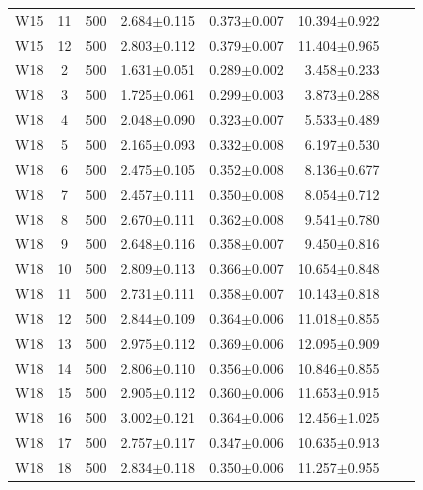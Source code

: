 \begin{table}[htbp]
\begin{tabular}{@{}ccrrrrrr@{}}
W15 & 11 & 500 & 2.684$\pm$0.115 & 0.373$\pm$0.007 & 10.394$\pm$0.922 \\
W15 & 12 & 500 & 2.803$\pm$0.112 & 0.379$\pm$0.007 & 11.404$\pm$0.965 \\
\midrule
W18 & 2 & 500 & 1.631$\pm$0.051 & 0.289$\pm$0.002 & 3.458$\pm$0.233 \\
W18 & 3 & 500 & 1.725$\pm$0.061 & 0.299$\pm$0.003 & 3.873$\pm$0.288 \\
W18 & 4 & 500 & 2.048$\pm$0.090 & 0.323$\pm$0.007 & 5.533$\pm$0.489 \\
W18 & 5 & 500 & 2.165$\pm$0.093 & 0.332$\pm$0.008 & 6.197$\pm$0.530 \\
W18 & 6 & 500 & 2.475$\pm$0.105 & 0.352$\pm$0.008 & 8.136$\pm$0.677 \\
W18 & 7 & 500 & 2.457$\pm$0.111 & 0.350$\pm$0.008 & 8.054$\pm$0.712 \\
W18 & 8 & 500 & 2.670$\pm$0.111 & 0.362$\pm$0.008 & 9.541$\pm$0.780 \\
W18 & 9 & 500 & 2.648$\pm$0.116 & 0.358$\pm$0.007 & 9.450$\pm$0.816 \\
W18 & 10 & 500 & 2.809$\pm$0.113 & 0.366$\pm$0.007 & 10.654$\pm$0.848 \\
W18 & 11 & 500 & 2.731$\pm$0.111 & 0.358$\pm$0.007 & 10.143$\pm$0.818 \\
W18 & 12 & 500 & 2.844$\pm$0.109 & 0.364$\pm$0.006 & 11.018$\pm$0.855 \\
W18 & 13 & 500 & 2.975$\pm$0.112 & 0.369$\pm$0.006 & 12.095$\pm$0.909 \\
W18 & 14 & 500 & 2.806$\pm$0.110 & 0.356$\pm$0.006 & 10.846$\pm$0.855 \\
W18 & 15 & 500 & 2.905$\pm$0.112 & 0.360$\pm$0.006 & 11.653$\pm$0.915 \\
W18 & 16 & 500 & 3.002$\pm$0.121 & 0.364$\pm$0.006 & 12.456$\pm$1.025 \\
W18 & 17 & 500 & 2.757$\pm$0.117 & 0.347$\pm$0.006 & 10.635$\pm$0.913 \\
W18 & 18 & 500 & 2.834$\pm$0.118 & 0.350$\pm$0.006 & 11.257$\pm$0.955 \\
\bottomrule
\end{tabular}
\end{table}
